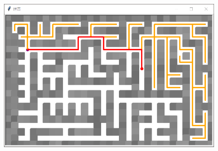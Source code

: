 \begin{tcolorbox}
	\begin{figure}[H]
		\centering
		\includegraphics[scale=0.7]{img/C13/13-6/2.png}
	\end{figure}
\end{tcolorbox}
